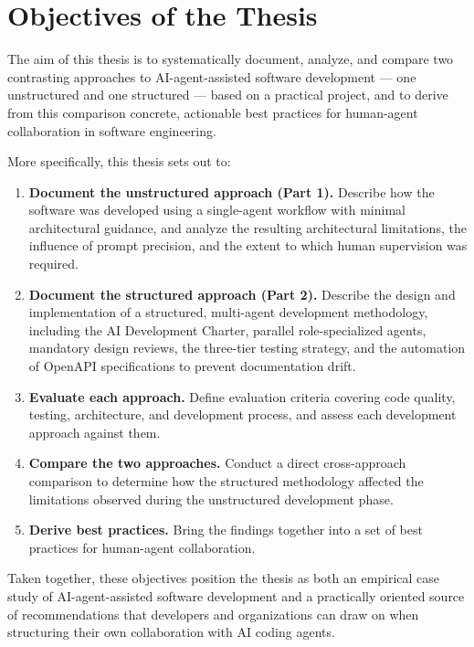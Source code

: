 \section{Objectives of the Thesis}

The aim of this thesis is to systematically document, analyze, and compare two contrasting approaches to AI-agent-assisted software development --- one unstructured and one structured --- based on a practical project, and to derive from this comparison concrete, actionable best practices for human-agent collaboration in software engineering.

More specifically, this thesis sets out to:

\begin{enumerate}
    \item \textbf{Document the unstructured approach (Part 1).} Describe how the software was developed using a single-agent workflow with minimal architectural guidance, and analyze the resulting architectural limitations, the influence of prompt precision, and the extent to which human supervision was required.
    \item \textbf{Document the structured approach (Part 2).} Describe the design and implementation of a structured, multi-agent development methodology, including the AI Development Charter, parallel role-specialized agents, mandatory design reviews, the three-tier testing strategy, and the automation of OpenAPI specifications to prevent documentation drift.
    \item \textbf{Evaluate each approach.} Define evaluation criteria covering code quality, testing, architecture, and development process, and assess each development approach against them.
    \item \textbf{Compare the two approaches.} Conduct a direct cross-approach comparison to determine how the structured methodology affected the limitations observed during the unstructured development phase.
    \item \textbf{Derive best practices.} Bring the findings together into a set of best practices for human-agent collaboration.
\end{enumerate}

Taken together, these objectives position the thesis as both an empirical case study of AI-agent-assisted software development and a practically oriented source of recommendations that developers and organizations can draw on when structuring their own collaboration with AI coding agents.

